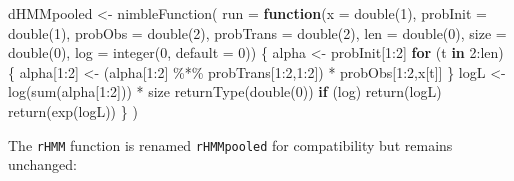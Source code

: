 \documentclass[
  12pt,
]{krantz}
\newenvironment{Shaded}{\begin{snugshade}}{\end{snugshade}}
\newcommand{\AttributeTok}[1]{\textcolor[rgb]{0.77,0.63,0.00}{#1}}
\newcommand{\ControlFlowTok}[1]{\textcolor[rgb]{0.13,0.29,0.53}{\textbf{#1}}}
\newcommand{\DecValTok}[1]{\textcolor[rgb]{0.00,0.00,0.81}{#1}}
\newcommand{\FunctionTok}[1]{\textcolor[rgb]{0.00,0.00,0.00}{#1}}
\newcommand{\NormalTok}[1]{#1}
\newcommand{\OtherTok}[1]{\textcolor[rgb]{0.56,0.35,0.01}{#1}}
\newcommand{\SpecialCharTok}[1]{\textcolor[rgb]{0.00,0.00,0.00}{#1}}
\begin{document}
\begin{Shaded}
\begin{Highlighting}[]
\NormalTok{dHMMpooled }\OtherTok{\textless{}{-}} \FunctionTok{nimbleFunction}\NormalTok{(}
  \AttributeTok{run =} \ControlFlowTok{function}\NormalTok{(}\AttributeTok{x =} \FunctionTok{double}\NormalTok{(}\DecValTok{1}\NormalTok{), }
                 \AttributeTok{probInit =} \FunctionTok{double}\NormalTok{(}\DecValTok{1}\NormalTok{),}
                 \AttributeTok{probObs =} \FunctionTok{double}\NormalTok{(}\DecValTok{2}\NormalTok{),}
                 \AttributeTok{probTrans =} \FunctionTok{double}\NormalTok{(}\DecValTok{2}\NormalTok{),}
                 \AttributeTok{len =} \FunctionTok{double}\NormalTok{(}\DecValTok{0}\NormalTok{),}
                 \AttributeTok{size =} \FunctionTok{double}\NormalTok{(}\DecValTok{0}\NormalTok{),}
                 \AttributeTok{log =} \FunctionTok{integer}\NormalTok{(}\DecValTok{0}\NormalTok{, }\AttributeTok{default =} \DecValTok{0}\NormalTok{)) \{}
\NormalTok{    alpha }\OtherTok{\textless{}{-}}\NormalTok{ probInit[}\DecValTok{1}\SpecialCharTok{:}\DecValTok{2}\NormalTok{]}
    \ControlFlowTok{for}\NormalTok{ (t }\ControlFlowTok{in} \DecValTok{2}\SpecialCharTok{:}\NormalTok{len) \{}
\NormalTok{      alpha[}\DecValTok{1}\SpecialCharTok{:}\DecValTok{2}\NormalTok{] }\OtherTok{\textless{}{-}}\NormalTok{ (alpha[}\DecValTok{1}\SpecialCharTok{:}\DecValTok{2}\NormalTok{] }\SpecialCharTok{\%*\%}\NormalTok{ probTrans[}\DecValTok{1}\SpecialCharTok{:}\DecValTok{2}\NormalTok{,}\DecValTok{1}\SpecialCharTok{:}\DecValTok{2}\NormalTok{]) }\SpecialCharTok{*}\NormalTok{ probObs[}\DecValTok{1}\SpecialCharTok{:}\DecValTok{2}\NormalTok{,x[t]]}
\NormalTok{    \}}
\NormalTok{    logL }\OtherTok{\textless{}{-}} \FunctionTok{log}\NormalTok{(}\FunctionTok{sum}\NormalTok{(alpha[}\DecValTok{1}\SpecialCharTok{:}\DecValTok{2}\NormalTok{])) }\SpecialCharTok{*}\NormalTok{ size}
    \FunctionTok{returnType}\NormalTok{(}\FunctionTok{double}\NormalTok{(}\DecValTok{0}\NormalTok{))}
    \ControlFlowTok{if}\NormalTok{ (log) }\FunctionTok{return}\NormalTok{(logL)}
    \FunctionTok{return}\NormalTok{(}\FunctionTok{exp}\NormalTok{(logL))}
\NormalTok{  \}}
\NormalTok{)}
\end{Highlighting}
\end{Shaded}

The \texttt{rHMM} function is renamed \texttt{rHMMpooled} for compatibility but remains unchanged:
\end{document}
